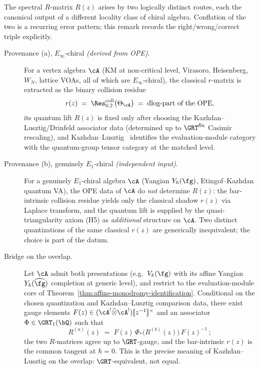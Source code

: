 \begin{remark}
\label{rem:r-matrix-two-provenances}
The spectral $R$-matrix $R(z)$ arises by two logically distinct routes, each the canonical output of a different locality class of chiral algebra. Conflation of the two is a recurring error pattern; this remark records the right/wrong/correct triple explicitly.
\begin{description}
\item[Provenance (a), $E_\infty$-chiral \emph{(derived from OPE)}.] For a vertex algebra $\cA$ (KM at non-critical level, Virasoro, Heisenberg, $W_N$, lattice VOAs, all of which are $E_\infty$-chiral), the classical $r$-matrix is extracted as the binary collision residue
\[
r(z) \;=\; \Res^{\mathrm{coll}}_{0,2}\bigl(\Theta_\cA\bigr) \;=\; \mathrm{dlog}\text{-part of the OPE},
\]
its quantum lift $R(z)$ is fixed only after choosing the
Kazhdan--Lusztig/Drinfeld associator data (determined up to
$\GRT^{\mathrm{fin}}$ Casimir rescaling), and
Kazhdan--Lusztig~\cite{KL94} identifies the evaluation-module category
with the quantum-group tensor category at the matched level.
\item[Provenance (b), genuinely $E_1$-chiral \emph{(independent input)}.] For a genuinely $E_1$-chiral algebra $\cA$ (Yangian $Y_\hbar(\fg)$, Etingof--Kazhdan quantum VA), the OPE data of $\cA$ do \emph{not} determine $R(z)$: the bar-intrinsic collision residue yields only the classical shadow $r(z)$ via Laplace transform, and the quantum lift is supplied by the quasi-triangularity axiom (H5) as \emph{additional} structure on $\cA$. Two distinct quantizations of the same classical $r(z)$ are generically inequivalent; the choice is part of the datum.
\item[Bridge on the overlap.] Let $\cA$ admit both presentations (e.g.\ $V_k(\fg)$ with its affine Yangian $Y_\hbar(\widehat{\fg})$ completion at generic level), and restrict to the evaluation-module core of Theorem~\ref{thm:affine-monodromy-identification}. Conditional on the chosen quantization and Kazhdan--Lusztig comparison data, there exist gauge elements $F(z) \in (\cA^!\widehat\otimes\cA^!)[\![z^{-1}]\!]^\times$ and an associator $\Phi \in \GRT_1(\bQ)$ such that
\[
R^{(a)}(z) \;=\; F(z)\,\Phi_*\!\bigl(R^{(b)}(z)\bigr)\,F(z)^{-1}\,;
\]
the two $R$-matrices agree up to $\GRT$-gauge, and the bar-intrinsic $r(z)$ is the common tangent at $\hbar=0$. This is the precise meaning of Kazhdan--Lusztig on the overlap: $\GRT$-equivalent, not equal.
\end{description}


\end{remark}
